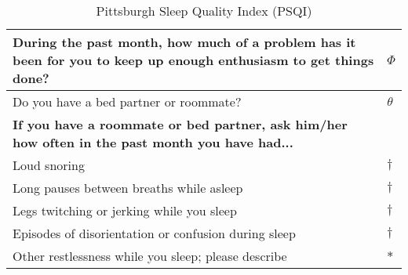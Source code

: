 \begin{table}[H]
\begin{tabularx}{\textwidth}{|X|l|}
        During the past month, how much of a problem has it been for you to keep up enough enthusiasm to get things done? & $\Phi$ \\ \hline
        Do you have a bed partner or roommate? & $\theta$ \\ \hline
        \textbf{If you have a roommate or bed partner, ask him/her how often in the past month you have had...} & \\ \hline
        \quad Loud snoring & $\dagger$ \\ \hline
        \quad Long pauses between breaths while asleep & $\dagger$ \\ \hline
        \quad Legs twitching or jerking while you sleep & $\dagger$ \\ \hline
        \quad Episodes of disorientation or confusion during sleep & $\dagger$ \\ \hline
        \quad Other restlessness while you sleep; please describe & $\ast$ \\ \hline
    \end{tabularx}
    \caption{Pittsburgh Sleep Quality Index (PSQI)}
    \label{tab:psqi}
\end{table}


